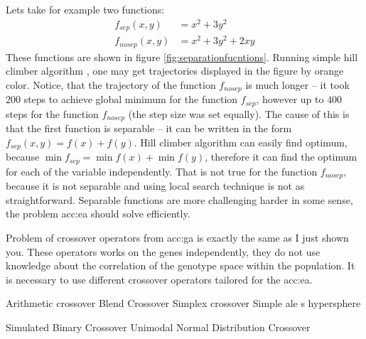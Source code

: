 Lets take for example two functions:
\begin{align*}
    f_{sep}(x,y)&=x^2+3y^2 \\
    f_{nosep}(x,y)&=x^2+3y^2+2xy
\end{align*}
These functions are shown in figure \ref{fig:separationfucntions}. Running simple hill climber algorithm \citep{HandbookOfMetaheuristics}, one may get trajectories displayed in the figure by orange color. Notice, that the trajectory of the function $f_{nosep}$ is much longer -- it took $200$ steps to achieve global minimum for the function $f_{sep}$, however up to $400$ steps for the function $f_{nosep}$ (the step size was set equally). The cause of this is that the first function is separable -- it can be written in the form $f_{sep}(x,y)=f(x)+f(y)$. Hill climber algorithm can easily find optimum, because $\min f_{sep}=\min f(x)+\min f(y)$, therefore it can find the optimum for each of the variable independently. That is not true for the function $f_{nosep}$, because it is not separable and using local search technique is not as straightforward. Separable functions are more challenging harder in some sense, the problem \acrshort{acc:ea} should solve efficiently.

Problem of crossover operators from \acrshort{acc:ga} is exactly the same as I just shown you. These operators works on the genes independently, they do not use knowledge about the correlation of the genotype space within the population. It is necessary to use different crossover operators tailored for the \acrshort{acc:ea}.

Arithmetic crossover
Blend Crossover
Simplex crossover
Simple ale s hypersphere

Simulated Binary Crossover
Unimodal Normal Distribution Crossover


